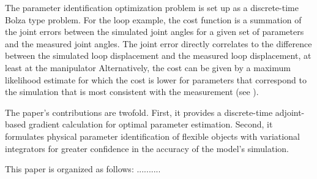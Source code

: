 \documentclass[letterpaper, 10pt, conference]{ieeeconf}
\begin{document}



The parameter identification optimization problem is set up as a discrete-time Bolza type problem.  For the loop example, the cost function is a summation of the joint errors between the simulated joint angles for a given set of parameters and the measured joint angles.  The joint error directly correlates to the difference between the simulated loop displacement and the measured loop displacement, at least at the manipulator   Alternatively, the cost can be given by a maximum likelihood estimate for which the cost is lower for parameters that correspond to the simulation that is most consistent with the measurement (see \cite{houska_etal}).  

The paper's contributions are twofold.  First, it provides a discrete-time adjoint-based gradient calculation for optimal parameter estimation.  Second, it formulates physical parameter identification of flexible objects with variational integrators for greater confidence in the accuracy of the model's simulation.

This paper is organized as follows: ..........





\end{document}
